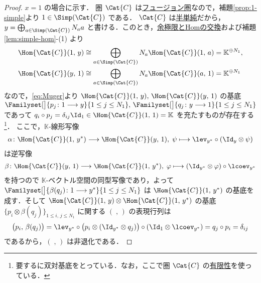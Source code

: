 \documentclass[TQFT_main]{subfiles}
\begin{document}
\begin{proof}
    $x = 1$ の場合に示す．
    圏 $\Cat{C}$ は\hyperref[def:tensorfusion-cat]{フュージョン圏}なので，補題\ref{prop:1-simple}より $1 \in \Simp(\Cat{C})$ である．
    $\Cat{C}$ は\hyperref[def:semisimple-cat]{半単純}だから，$y = \bigoplus_{a \in \Simp(\Cat{C})} N_a a$ と書ける．このとき，\hyperref[prop:lim-colim-basic]{余極限とHomの交換}および補題\ref{lem:simple-hom}-(1) より
    \begin{align}
        \Hom{\Cat{C}}(1,\, y) &\cong \bigoplus_{a \in \Simp(\Cat{C})} N_a \Hom{\Cat{C}}(1,\, a) = \mathbb{K}^{\oplus N_1}, \\
        \Hom{\Cat{C}}(y,\, 1) &\cong \bigoplus_{a \in \Simp(\Cat{C})} N_a \Hom{\Cat{C}}(a,\, 1) = \mathbb{K}^{\oplus N_1}
    \end{align}
    なので，\eqref{eq:Muger}より $\Hom{\Cat{C}}(1,\, y),\, \Hom{\Cat{C}}(y,\, 1)$ の基底 $\Familyset[\big]{p_j \colon 1 \lto y}{1 \le j \le N_1},\, \Familyset[\big]{q_j \colon y \lto 1}{1 \le j \le N_1}$ であって $q_i \circ p_j = \delta_{ij} \Id_1 \in \Hom{\Cat{C}}(1,\, 1) = \mathbb{K}$ を充たすものが存在する\footnote{要するに双対基底をとっている．なお，ここで圏 $\Cat{C}$ の\hyperref[def:finite-abcat]{有限性}を使っている．}．
    ここで，$\mathbb{K}$-線形写像
    \begin{align}
        \alpha \colon \Hom{\Cat{C}}(1,\, y^*) \lto \Hom{\Cat{C}}(y,\, 1),\; \psi \lmto \lev_{y^*} \circ (\Id_y \otimes \psi)
    \end{align}
    は逆写像
    \begin{align}
        \beta \colon \Hom{\Cat{C}}(y,\, 1) \lto \Hom{\Cat{C}}(1,\, y^*),\; \varphi \lmto (\Id_{y^*} \otimes \varphi) \circ \lcoev_{y^*}
    \end{align}
    を持つので $\mathbb{K}$-ベクトル空間の同型写像であり，よって $\Familyset[\big]{\beta(q_j) \colon 1 \lto y^* }{1 \le j \le N_1}$ は $\Hom{\Cat{C}}(1,\, y^*)$ の基底を成す．そして
    $\Hom{\Cat{C}}(1,\, y) \otimes \Hom{\Cat{C}}(1,\, y^*)$ の基底 $\{p_i \otimes \beta(q_j)\}_{1 \le i,\, j \le N_1}$ に関する $(\;,\,)$ の表現行列は
    \begin{align}
        \bigl(p_i,\, \beta(q_j)\bigr) = \lev_{y^*} \circ \bigl(p_i \otimes (\Id_{y^*} \otimes q_j)\bigr) \circ (\Id_1 \otimes \lcoev_{y^*}) = q_j \circ p_i = \delta_{ij}
    \end{align}
    であるから，$(\;,\, )$ は非退化である．

\end{proof}
\end{document}

